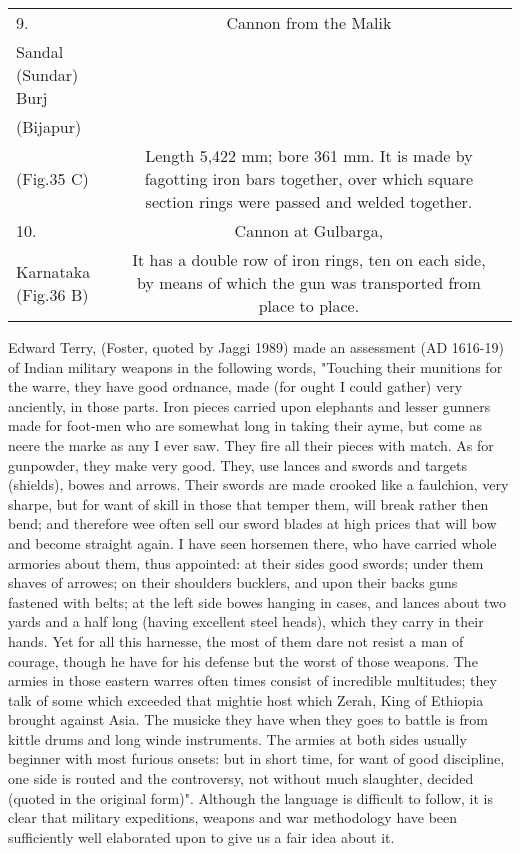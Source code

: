\begin{longtable}{|l|c|p{5cm}|}
\hline
9. & Cannon from the Malik\\ Sandal (Sundar) Burj\\ (Bijapur)\\ (Fig.35 C) & Length 5,422 mm; bore 361 mm. It is made by fagotting iron bars together, over which square section rings were passed and welded together. \\
\hline
10. & Cannon at Gulbarga,\\ Karnataka (Fig.36 B) & It has a double row of iron rings, ten on each side, by means of which the gun was transported from place to place. \\
\hline
\end{longtable}

Edward Terry, (Foster, quoted by Jaggi 1989) made an assessment (AD 1616-19) of Indian military weapons in the following words, "Touching their munitions for the warre, they have good ordnance, made (for ought I could gather) very anciently, in those parts. Iron pieces carried upon elephants and lesser gunners made for foot-men who are somewhat long in taking their ayme, but come as neere the marke as any I ever saw. They fire all their pieces with match. As for gunpowder, they make very good. They, use lances and swords and targets (shields), bowes and arrows. Their swords are made crooked like a faulchion, very sharpe, but for want of skill in those that temper them, will break rather then bend; and therefore wee often sell our sword blades at high prices that will bow and become straight again. I have seen horsemen there, who have carried whole armories about them, thus appointed: at their sides good swords; under them shaves of arrowes; on their shoulders bucklers, and upon their backs guns fastened with belts; at the left side bowes hanging in cases, and lances about two yards and a half long (having excellent steel heads), which they carry in their hands. Yet for all this harnesse, the most of them dare not resist a man of courage, though he have for his defense but the worst of those weapons. The armies in those eastern warres often times consist of incre­dible multitudes; they talk of some which exceeded that mightie host which Zerah, King of Ethiopia brought against Asia. The musicke they have when they goes to battle is from kittle drums and long winde instruments. The armies at both sides usually beginner with most furious onsets: but in short time, for want of good discipline, one side is routed and the controversy, not without much slaughter, decided (quoted in the original form)". Although the language is difficult to follow, it is clear that military expeditions, weapons and war methodology have been sufficiently well elaborated upon to give us a fair idea about it.

